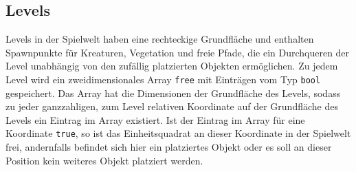 \subsection{Levels}
Levels in der Spielwelt haben eine rechteckige Grundfläche und enthalten Spawnpunkte für Kreaturen, Vegetation und freie Pfade, die ein Durchqueren der Level unabhängig von den zufällig platzierten Objekten ermöglichen.
Zu jedem Level wird ein zweidimensionales Array \texttt{free} mit Einträgen vom Typ \texttt{bool} gespeichert. Das Array hat die Dimensionen der Grundfläche des Levels, sodass zu jeder ganzzahligen, zum Level relativen Koordinate auf der Grundfläche des Levels ein Eintrag im Array existiert. Ist der Eintrag im Array für eine Koordinate \texttt{true}, so ist das Einheitsquadrat an dieser Koordinate in der Spielwelt frei, andernfalls befindet sich hier ein platziertes Objekt oder es soll an dieser Position kein weiteres Objekt platziert werden.
 
